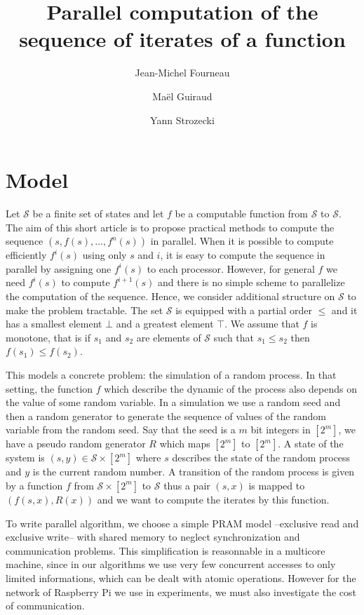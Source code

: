 \documentclass[a4paper,10pt]{article}
\title{Parallel computation of the sequence of iterates of a function }
\author{Jean-Michel Fourneau \and Maël Guiraud \and Yann Strozecki}
\newcommand{\cS}{\mathcal{S}}
\begin{document}
\maketitle

\begin{abstract}

\end{abstract}

\section{Model}

Let $\cS$ be a finite set of states and let $f$ be a computable function from $\cS$ to $\cS$. 
The aim of this short article is to propose practical methods to compute the sequence $(s,f(s),\dots,f^n(s))$ in parallel.
When it is possible to compute efficiently $f^i(s)$ using only $s$ and $i$, it is easy to compute the sequence
in parallel by assigning one $f^i(s)$ to each processor. However, for general $f$ we need $f^{i}(s)$ to compute $f^{i+1}(s)$ and there is no simple scheme to parallelize the computation of the sequence. 
Hence, we consider additional structure on $\cS$ to make the problem tractable. The set $\cS$ is equipped with a partial order 
$\leq$ and it has a smallest element $\bot$ and a greatest element $ \top$. We assume that $f$ is monotone, that is 
if $s_1$ and $s_2$ are elements of $\cS$ such that $s_1 \leq s_2$ then $f(s_1) \leq f(s_2)$.

This models a concrete problem: the simulation of a random process. In that setting, the function $f$ which describe the dynamic of the process also depends on the value of some random variable. In a simulation we use a random seed and then a random generator to generate the sequence of values of the random variable from the random seed. Say that the seed is a $m$ bit integers in $[2^m]$, we have a pseudo random generator $R$ which maps $[2^m]$ to $[2^m]$. A state of the system is $(s,y) \in \cS \times [2^m]$ where $s$ describes the state of the random process and $y$ is the current random number. A transition of the random process is given by a function $f$ from $\cS \times [2^m]$ to $\cS$ thus a pair $(s,x)$ is mapped to $(f(s,x),R(x))$ and we want to compute the iterates by this function.


To write parallel algorithm, we choose a simple PRAM model --exclusive read and exclusive write-- with shared memory  to neglect synchronization and communication problems. This simplification is reasonnable in a multicore machine, since in our algorithms we use very few concurrent accesses to only limited informations, which can be dealt with atomic operations.  However for the network of Raspberry Pi we use in experiments, we must also investigate the cost of communication.
\end{document}
